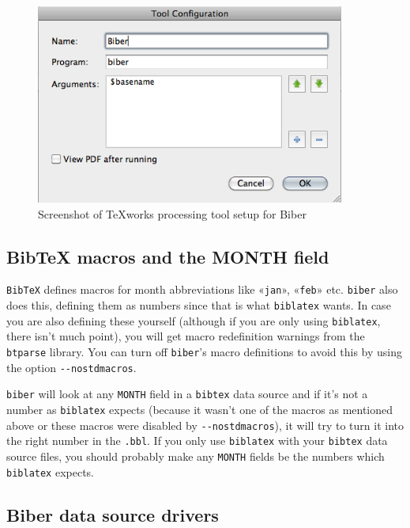 \documentclass{ltxdockit}
\begin{document}
\begin{figure}[!htbp]
  \centering
  \includegraphics[width=4in,keepaspectratio=true]{biber-texworks.png}
  \caption{Screenshot of TeXworks processing tool setup for Biber}
  \label{fig:biber-texworks}
\end{figure}

\subsection{BibTeX macros and the MONTH field}

\verb+BibTeX+ defines macros for month abbreviations
like «\verb+jan+», «\verb+feb+» etc. \verb+biber+ also does this,
defining them as numbers since that is what \verb+biblatex+ wants. In
case you are also defining these yourself (although if you are only
using \verb+biblatex+, there isn't much point), you will get macro
redefinition warnings from the \verb+btparse+ library. You can turn
off \verb+biber+'s macro definitions to avoid this by using the option
\verb+--nostdmacros+.

\verb+biber+ will look at any \verb+MONTH+ field in a \verb+bibtex+ data
source and if it's not a number as \verb+biblatex+ expects (because it
wasn't one of the macros as mentioned above or these macros were disabled
by \verb+--nostdmacros+), it will try to turn it into the right number in
the \verb+.bbl+. If you only use \verb+biblatex+ with your \verb+bibtex+
data source files, you should probably make any \verb+MONTH+ fields be the
numbers which \verb+biblatex+ expects.

\subsection{Biber data source drivers}\label{dcf}
\end{document}
